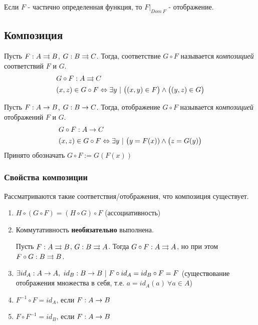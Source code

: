 \begin{proposition}
	Если $F$ - частично определенная функция, то $F|_{Dom\ F}$ - отображение.
\end{proposition}

\subsection{Композиция}

\begin{definition}
	Пусть $F : A \rightrightarrows B$, $G : B \rightrightarrows C$. Тогда, соответствие $G \circ F$ называется \textit{композицией} соответствий $F$ и $G$.
	\begin{align*}
		&G \circ F : A \rightrightarrows C
		\\
		&(x, z) \in G \circ F \Leftrightarrow \exists y\ |\ \big((x, y) \in F\big) \wedge \big((y, z) \in G\big)
	\end{align*}
\end{definition}

\begin{definition}
	Пусть $F : A \rightarrow B$, $G : B \rightarrow C$. Тогда, отображение $G \circ F$ называется \textit{композицией} отображений $F$ и $G$.
	\begin{align*}
	&G \circ F : A \rightarrow C
	\\
	&(x, z) \in G \circ F \Leftrightarrow \exists y\ |\ \big(y = F(x)) \wedge \big(z =  G(y)\big)
	\end{align*}
	Принято обозначать $G \circ F := G(F(x))$
\end{definition}

\subsubsection*{Свойства композиции}

Рассматриваются такие соответствия/отображения, что композиция существует.
\begin{enumerate}
	\item $H \circ (G \circ F) = (H \circ G) \circ F$ (ассоциативность)
	\item Коммутативность \textbf{необязательно} выполнена.
	\begin{example}
		Пусть $F : A \rightrightarrows B$, $G : B \rightrightarrows A$. Тогда $G \circ F : A \rightrightarrows A$, но при этом $F \circ G : B \rightrightarrows B$.
	\end{example}
	\item $\exists id_A : A \rightarrow A,\ id_B : B \rightarrow B\ |\ F \circ id_A = id_B \circ F = F$ (существование отображения множества в себя, т.е. $a = id_A(a)\ \forall a \in A$)
	\item $F^{-1} \circ F = id_A$, если $F : A \rightarrow B$
	\item $F \circ F^{-1} = id_B$, если $F : A \rightarrow B$
\end{enumerate}